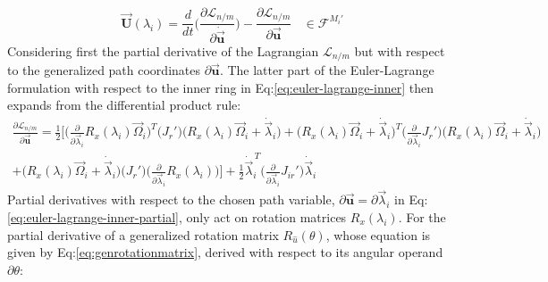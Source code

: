 \begin{equation}\label{eq:euler-lagrange-inner}
\vec{\mathbf{U}}(\lambda_i)=\frac{d}{dt}\bigg(\frac{\partial \mathcal{L}_{n/m}}{\partial \dot{\vec{\mathbf{u}}}}\bigg)-\frac{\partial \mathcal{L}_{n/m}}{\partial \vec{\mathbf{u}}}~~~~\in\mathcal{F}^{M_i'}
\end{equation}
Considering first the partial derivative of the Lagrangian $\mathcal{L}_{n/m}$ but with respect to the generalized path coordinates $\partial\vec{\mathbf{u}}$. The latter part of the Euler-Lagrange formulation with respect to the inner ring in Eq:\ref{eq:euler-lagrange-inner} then expands from the differential product rule:
\begin{multline}\label{eq:euler-lagrange-inner-partial}
\frac{\partial\mathcal{L}_{n/m}}{\partial\vec{\mathbf{u}}}=\frac{1}{2}\Bigg[\bigg(\frac{\partial}{\partial\vec{\lambda}_i}R_x(\lambda_i)\vec{\Omega}_i\bigg)^T\big(J_r'\big)\Big(R_x(\lambda_i)\vec{\Omega}_i+\dot{\vec{\lambda}}_i\Big)+\Big(R_x(\lambda_i)\vec{\Omega}_i+\dot{\vec{\lambda}}_i\Big)^T\bigg(\frac{\partial}{\partial\vec{\lambda}_i}J_r'\bigg)\Big(R_x(\lambda_i)\vec{\Omega}_i+\dot{\vec{\lambda}}_i\Big)
\\
+\Big(R_x(\lambda_i)\vec{\Omega}_i+\dot{\vec{\lambda}}_i\Big)\big(J_r'\big)\bigg(\frac{\partial}{\partial\vec{\lambda}_i}R_x(\lambda_i)\bigg)\Bigg]+\frac{1}{2}\dot{\vec{\lambda}}_i^{\hspace{2pt}T}\bigg(\frac{\partial}{\partial\vec{\lambda}_i}J_{ir}'\bigg)\dot{\vec{\lambda}}_i
\end{multline}
Partial derivatives with respect to the chosen path variable, $\partial\vec{\mathbf{u}}=\partial\vec{\lambda}_i$ in Eq:\ref{eq:euler-lagrange-inner-partial}, only act on rotation matrices $R_x(\lambda_i)$. For the partial derivative of a generalized rotation matrix $R_{\hat{u}}(\theta)$, whose equation is given by Eq:\ref{eq:genrotationmatrix}, derived with respect to its angular operand $\partial\theta$:
